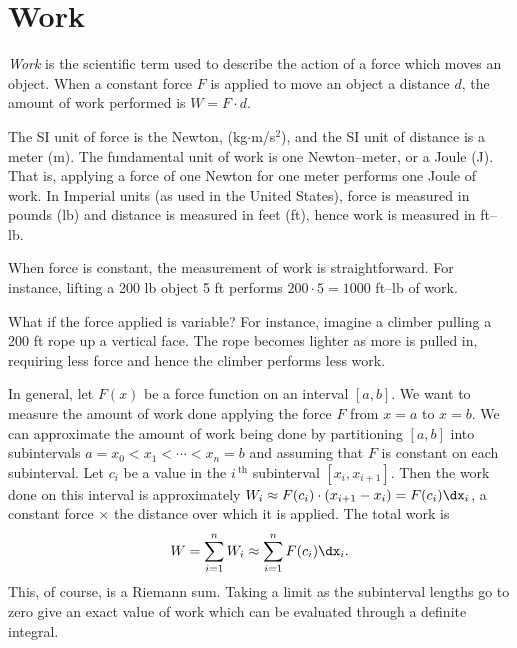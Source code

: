 \section{Work}\label{sec:work}

\textit{Work} is the scientific term used to describe the action of a force which moves an object. When a constant force $F$ is applied to move an object a distance $d$, the amount of work performed is $W=F\cdot d$. 

The SI unit of force is the Newton, (kg$\cdot$m/s$^2$), and the SI unit of distance is a meter (m). The fundamental unit of work is one Newton--meter, or a Joule (J). That is, applying a force of one Newton for one meter performs one Joule of work. In Imperial units (as used in the United States), force is measured in pounds (lb) and distance is measured in feet (ft), hence work is measured in ft--lb. 


When force is constant, the measurement of work is straightforward. For instance, lifting a 200 lb object 5 ft performs $200\cdot 5 = 1000$ ft--lb of work. 

What if the force applied is variable? For instance, imagine a climber pulling a 200 ft rope up a vertical face. The rope becomes lighter as more is pulled in, requiring less force and hence the climber performs less work.

In general, let $F(x)$ be a force function on an interval $[a,b]$. We want to measure the amount of work done applying the force $F$ from $x=a$ to $x=b$. We can approximate the amount of work being done by partitioning $[a,b]$ into subintervals $a=x_0<x_1 <\cdots <x_n=b$ and assuming that $F$ is constant on each subinterval. Let $c_i$ be a value in the $i\,^{\text{th}}$ subinterval $[x_i,x_{i+1}]$. Then the work done on this interval is approximately $W_i\approx F(c_i)\cdot(x_{i+1}-x_i) = F(c_i)\dx_i$, a constant force $\times$ the distance over which it is applied. The total work is 
\[ W = \sum_{i=1}^n W_i \approx \sum_{i=1}^n F(c_i)\dx_i.\]
This, of course, is a Riemann sum. Taking a limit as the subinterval lengths go to zero give an exact value of work which can be evaluated through a definite integral.

